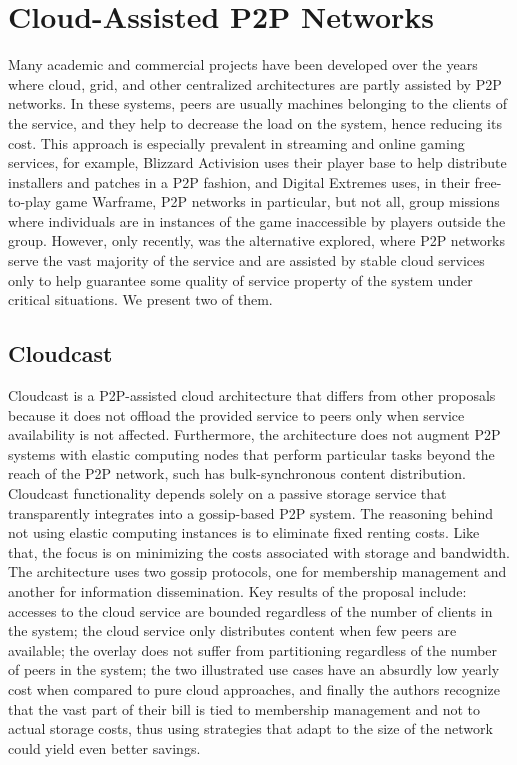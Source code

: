 \documentclass[runningheads]{llncs}
\begin{document}
\section{Cloud-Assisted P2P Networks}\label{sec:ca-networks}

Many academic and commercial projects have been developed over the years where cloud, grid, and other centralized architectures are partly assisted by P2P networks. In these systems, peers are usually machines belonging to the clients of the service, and they help to decrease the load on the system, hence reducing its cost. This approach is especially prevalent in streaming and online gaming services, for example, Blizzard Activision uses their player base to help distribute installers and patches in a P2P fashion, and Digital Extremes uses, in their free-to-play game Warframe, P2P networks in particular, but not all, group missions where individuals are in instances of the game inaccessible by players outside the group. However, only recently, was the alternative explored, where P2P networks serve the vast majority of the service and are assisted by stable cloud services only to help guarantee some quality of service property of the system under critical situations. We present two of them.

\subsection{Cloudcast}
Cloudcast \cite{cloudcast} is a P2P-assisted cloud architecture that differs from other proposals because it does not offload the provided service to peers only when service availability is not affected. Furthermore, the architecture does not augment P2P systems with elastic computing nodes that perform particular tasks beyond the reach of the P2P network, such has bulk-synchronous content distribution. Cloudcast functionality depends solely on a passive storage service that transparently integrates into a gossip-based P2P system. The reasoning behind not using elastic computing instances is to eliminate fixed renting costs. Like that, the focus is on minimizing the costs associated with storage and bandwidth. The architecture uses two gossip protocols, one for membership management and another for information dissemination. Key results of the proposal include: accesses to the cloud service are bounded regardless of the number of clients in the system; the cloud service only distributes content when few peers are available; the overlay does not suffer from partitioning regardless of the number of peers in the system; the two illustrated use cases have an absurdly low yearly cost when compared to pure cloud approaches, and finally the authors recognize that the vast part of their bill is tied to membership management and not to actual storage costs, thus using strategies that adapt to the size of the network could yield even better savings.
\end{document}
